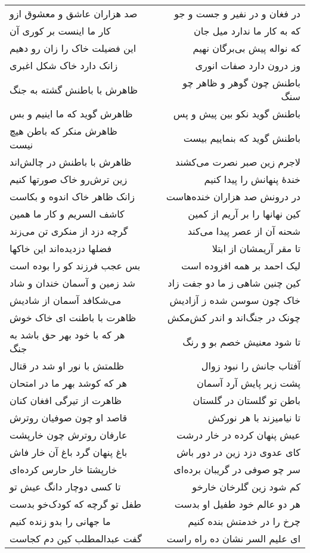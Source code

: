 \begin{center}
\begin{longtable}{l p{0.5cm} r}
صد هزاران عاشق و معشوق ازو
&&
در فغان و در نفیر و جست و جو
\\
کار ما اینست بر کوری آن
&&
که به کار ما ندارد میل جان
\\
این فضیلت خاک را زان رو دهیم
&&
که نواله پیش بی‌برگان نهیم
\\
زانک دارد خاک شکل اغبری
&&
وز درون دارد صفات انوری
\\
ظاهرش با باطنش گشته به جنگ
&&
باطنش چون گوهر و ظاهر چو سنگ
\\
ظاهرش گوید که ما اینیم و بس
&&
باطنش گوید نکو بین پیش و پس
\\
ظاهرش منکر که باطن هیچ نیست
&&
باطنش گوید که بنماییم بیست
\\
ظاهرش با باطنش در چالش‌اند
&&
لاجرم زین صبر نصرت می‌کشند
\\
زین ترش‌رو خاک صورتها کنیم
&&
خندهٔ پنهانش را پیدا کنیم
\\
زانک ظاهر خاک اندوه و بکاست
&&
در درونش صد هزاران خنده‌هاست
\\
کاشف السریم و کار ما همین
&&
کین نهانها را بر آریم از کمین
\\
گرچه دزد از منکری تن می‌زند
&&
شحنه آن از عصر پیدا می‌کند
\\
فضلها دزدیده‌اند این خاکها
&&
تا مقر آریمشان از ابتلا
\\
بس عجب فرزند کو را بوده است
&&
لیک احمد بر همه افزوده است
\\
شد زمین و آسمان خندان و شاد
&&
کین چنین شاهی ز ما دو جفت زاد
\\
می‌شکافد آسمان از شادیش
&&
خاک چون سوسن شده ز آزادیش
\\
ظاهرت با باطنت ای خاک خوش
&&
چونک در جنگ‌اند و اندر کش‌مکش
\\
هر که با خود بهر حق باشد به جنگ
&&
تا شود معنیش خصم بو و رنگ
\\
ظلمتش با نور او شد در قتال
&&
آفتاب جانش را نبود زوال
\\
هر که کوشد بهر ما در امتحان
&&
پشت زیر پایش آرد آسمان
\\
ظاهرت از تیرگی افغان کنان
&&
باطن تو گلستان در گلستان
\\
قاصد او چون صوفیان روترش
&&
تا نیامیزند با هر نورکش
\\
عارفان روترش چون خارپشت
&&
عیش پنهان کرده در خار درشت
\\
باغ پنهان گرد باغ آن خار فاش
&&
کای عدوی دزد زین در دور باش
\\
خارپشتا خار حارس کرده‌ای
&&
سر چو صوفی در گریبان برده‌ای
\\
تا کسی دوچار دانگ عیش تو
&&
کم شود زین گلرخان خارخو
\\
طفل تو گرچه که کودک‌خو بدست
&&
هر دو عالم خود طفیل او بدست
\\
ما جهانی را بدو زنده کنیم
&&
چرخ را در خدمتش بنده کنیم
\\
گفت عبدالمطلب کین دم کجاست
&&
ای علیم السر نشان ده راه راست
\\
\end{longtable}
\end{center}

